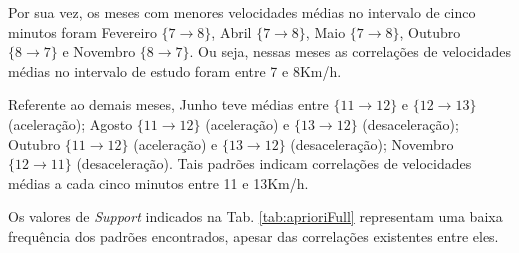 \documentclass[
	12pt,				%
	oneside,			%
	a4paper,			%
	english,			%
	brazil				%
	]{abntex2ppgsi}
\begin{document}
Por sua vez, os meses com menores velocidades médias no intervalo de cinco minutos foram Fevereiro $\lbrace 7 \rightarrow 8\rbrace$, Abril $\lbrace 7 \rightarrow 8 \rbrace$, Maio $\lbrace7 \rightarrow 8\rbrace$, Outubro $\lbrace8 \rightarrow 7\rbrace$ e Novembro $\lbrace8 \rightarrow 7\rbrace$. Ou seja, nessas meses as correlações de velocidades médias no intervalo de estudo foram entre 7 e 8Km/h.

Referente ao demais meses, Junho teve médias entre $\lbrace11 \rightarrow 12\rbrace$ e $\lbrace12 \rightarrow 13\rbrace$ (aceleração); Agosto $\lbrace11 \rightarrow 12\rbrace$ (aceleração) e $\lbrace13 \rightarrow 12\rbrace$  (desaceleração); Outubro $\lbrace11 \rightarrow 12\rbrace$ (aceleração) e $\lbrace13 \rightarrow 12\rbrace$ (desaceleração); Novembro $\lbrace12 \rightarrow 11\rbrace$ (desaceleração). Tais padrões indicam correlações de velocidades médias a cada cinco minutos entre 11 e 13Km/h.

Os valores de \textit{Support} indicados na Tab. \ref{tab:aprioriFull} representam uma baixa frequência dos padrões encontrados, apesar das correlações existentes entre eles. 
\end{document}
